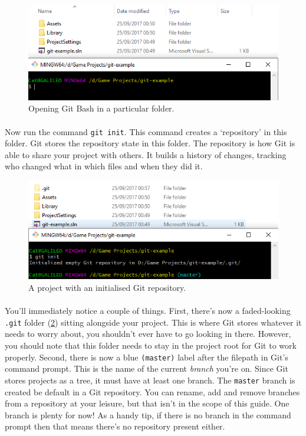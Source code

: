 \documentclass{article}
\begin{document}
\begin{figure}
    \includegraphics[width=\linewidth]{images/pre-init.png}
    \caption{Opening Git Bash in a particular folder.}
    \label{fig:pre-init}
\end{figure}

\paragraph{}
Now run the command \texttt{git init}. This command creates a `repository' in this folder. Git stores the repository state in this folder. The repository is how Git is able to share your project with others. It builds a history of changes, tracking who changed what in which files and when they did it. 

\begin{figure}
    \includegraphics[width=\linewidth]{images/post-init.png}
    \caption{A project with an initialised Git repository.}
    \label{fig:post-init}
\end{figure}

\paragraph{}
You'll immediately notice a couple of things. First, there's now a faded-looking \texttt{.git} folder (\ref{fig:post-init}) sitting alongside your project. This is where Git stores whatever it needs to worry about, you shouldn't ever have to go looking in there. However, you should note that this folder needs to stay in the project root for Git to work properly. Second, there is now a blue \texttt{(master)} label after the filepath in Git's command prompt. This is the name of the current \textit{branch} you're on. Since Git stores projects as a tree, it must have at least one branch. The \texttt{master} branch is created be default in a Git repository. You can rename, add and remove branches from a repository at your leisure, but that isn't in the scope of this guide. One branch is plenty for now! As a handy tip, if there is no branch in the command prompt then that means there's no repository present either.
\end{document}
